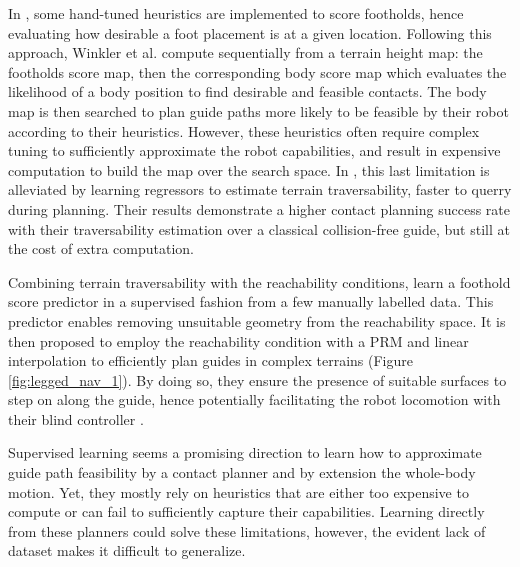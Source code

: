 In \cite{kolter_2008, terrain_map_mrinal_2011, wermelinger_2016}, some hand-tuned heuristics are implemented to score footholds, hence evaluating how desirable a foot placement is at a given location. 
Following this approach, Winkler et al. \cite{winkler_2014} compute sequentially from a terrain height map: the footholds score map, then the corresponding body score map which evaluates the likelihood of a body position to find desirable and feasible contacts.
The body map is then searched to plan guide paths more likely to be feasible by their robot according to their heuristics.
However, these heuristics often require complex tuning to sufficiently approximate the robot capabilities, and result in expensive computation to build the map over the search space.
In \cite{lin_traversability_2017}, this last limitation is alleviated by learning regressors to estimate terrain traversability, faster to querry during planning. Their results demonstrate a higher contact planning success rate with their traversability estimation over a classical collision-free guide, but still at the cost of extra computation.

Combining terrain traversability with the reachability conditions, \cite{rough_terrain_reachability_hutter_2021} learn a foothold score predictor in a supervised fashion from a few manually labelled data. This predictor enables removing unsuitable geometry from the reachability space.
It is then proposed to employ the reachability condition with a PRM and linear interpolation to efficiently plan guides in complex terrains (Figure \ref{fig:legged_nav_1}).
By doing so, they ensure the presence of suitable surfaces to step on along the guide, hence potentially facilitating the robot locomotion with their blind controller \cite{hutter_challenging_terrain}.


Supervised learning seems a promising direction to learn how to approximate guide path feasibility by a contact planner and by extension the whole-body motion. 
Yet, they mostly rely on heuristics that are either too expensive to compute or can fail to sufficiently capture their capabilities.
Learning directly from these planners could solve these limitations, however, the evident lack of dataset makes it difficult to generalize.



